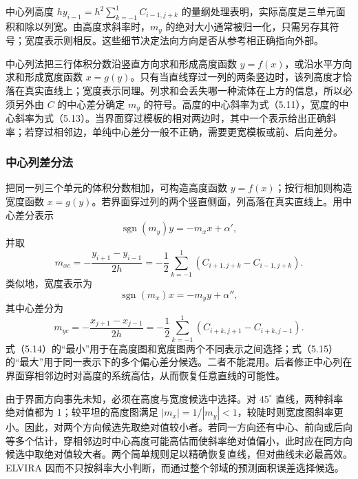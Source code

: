 \documentclass[11pt,a4paper,openany,fontset=none]{ctexbook}
\begin{document}
中心列高度 $hy_{i-1}=h^2\sum_{k=-1}^{1}C_{i-1,j+k}$ 的量纲处理表明，实际高度是三单元面积和除以列宽。由高度求斜率时，$m_y$ 的绝对大小通常被归一化，只需另存其符号；宽度表示则相反。这些细节决定法向方向是否从参考相正确指向外部。

中心列法把三行体积分数沿竖直方向求和形成高度函数 $y=f(x)$，或沿水平方向求和形成宽度函数 $x=g(y)$。只有当直线穿过一列的两条竖边时，该列高度才恰落在真实直线上；宽度表示同理。列求和会丢失哪一种流体在上方的信息，所以必须另外由 $C$ 的中心差分确定 $m_y$ 的符号。高度的中心斜率为式（5.11），宽度的中心斜率为式（5.13）。当界面穿过模板的相对两边时，其中一个表示给出正确斜率；若穿过相邻边，单纯中心差分一般不正确，需要更宽模板或前、后向差分。

\subsubsection{中心列差分法}

把同一列三个单元的体积分数相加，可构造高度函数 $y=f(x)$；按行相加则构造宽度函数 $x=g(y)$。若界面穿过列的两个竖直侧面，列高落在真实直线上。用中心差分表示
\begin{equation}
\operatorname{sgn}(m_y)y=-m_xx+\alpha',
\tag{5.10}
\end{equation}
并取
\begin{equation}
m_{xc}=-\frac{y_{i+1}-y_{i-1}}{2h}
=-\frac12\sum_{k=-1}^{1}(C_{i+1,j+k}-C_{i-1,j+k}).
\tag{5.11}
\end{equation}
类似地，宽度表示为
\begin{equation}
\operatorname{sgn}(m_x)x=-m_yy+\alpha'',
\tag{5.12}
\end{equation}
其中心差分为
\begin{equation}
m_{yc}=-\frac{x_{j+1}-x_{j-1}}{2h}
=-\frac12\sum_{k=-1}^{1}(C_{i+k,j+1}-C_{i+k,j-1}).
\tag{5.13}
\end{equation}
式（5.14）的“最小”用于在高度图和宽度图两个不同表示之间选择；式（5.15）的“最大”用于同一表示下的多个偏心差分候选。二者不能混用。后者修正中心列在界面穿相邻边时对高度的系统高估，从而恢复任意直线的可能性。

由于界面方向事先未知，必须在高度与宽度候选中选择。对 $45^\circ$ 直线，两种斜率绝对值都为 1；较平坦的高度图满足 $|m_x|=1/|m_y|<1$，较陡时则宽度图斜率更小。因此，对两个方向候选先取绝对值较小者。若同一方向还有中心、前向或后向等多个估计，穿相邻边时中心高度可能高估而使斜率绝对值偏小，此时应在同方向候选中取绝对值较大者。两个简单规则足以精确恢复直线，但对曲线未必最高效。ELVIRA 因而不只按斜率大小判断，而通过整个邻域的预测面积误差选择候选。
\end{document}
